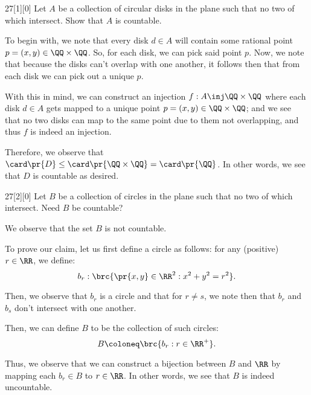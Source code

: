 \documentclass{article}
\begin{document}
\begin{hw}{27}[1][0]
	Let $A$ be a collection of circular disks in the plane such that no two of which intersect. Show that $A$ is countable.
\end{hw}
\begin{solution}
	To begin with, we note that every disk $d \in A$ will contain some rational point $p = (x,y) \in \QQ \times \QQ$. So, for each disk, we can pick said point $p$. Now, we note that because the disks can't overlap with one another, it follows then that from each disk we can pick out a unique $p$.
	
	With this in mind, we can construct an injection $f: A \inj \QQ \times \QQ$ where each disk $d \in A$ gets mapped to a unique point $p = (x,y) \in \QQ \times \QQ$; and we see that no two disks can map to the same point due to them not overlapping, and thus $f$ is indeed an injection.
	
	Therefore, we observe that $\card \pr{D} \leq \card \pr{\QQ \times \QQ} = \card \pr{\QQ}$. In other words, we see that $D$ is countable as desired.
\end{solution}

\begin{hw}{27}[2][0]
	Let $B$ be a collection of circles in the plane such that no two of which intersect. Need $B$ be countable?
\end{hw}
\begin{solution}
	We observe that the set $B$ is not countable.
	
	To prove our claim, let us first define a circle as follows: for any (positive) $r \in \RR$, we define:
	\begin{equation*}
		b_r : \brc{\pr{x,y} \in \RR^{2} : x^{2} + y^{2} = r^{2}}.
	\end{equation*}

	Then, we observe that $b_r$ is a circle and that for $r \neq s$, we note then that $b_r$ and $b_s$ don't intersect with one another.
	
	Then, we can define $B$ to be the collection of such circles:
	\begin{equation*}
		B \coloneq \brc{b_r : r \in \RR^{+}}.
	\end{equation*}

	Thus, we observe that we can construct a bijection between $B$ and $\RR$ by mapping each $b_r \in B$ to $r \in \RR$. In other words, we see that $B$ is indeed uncountable.
\end{solution}
\end{document}
